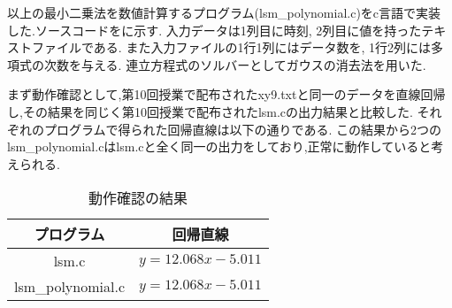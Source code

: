 以上の最小二乗法を数値計算するプログラム(lsm\_polynomial.c)をc言語で実装した.ソースコードをに示す.
入力データは1列目に時刻,
2列目に値を持ったテキストファイルである.
また入力ファイルの1行1列にはデータ数を,
1行2列には多項式の次数を与える.
連立方程式のソルバーとしてガウスの消去法を用いた.

まず動作確認として,第10回授業で配布されたxy9.txtと同一のデータを直線回帰し,その結果を同じく第10回授業で配布されたlsm.cの出力結果と比較した.
それぞれのプログラムで得られた回帰直線は以下の通りである.
この結果から2つのlsm\_polynomial.cはlsm.cと全く同一の出力をしており,正常に動作していると考えられる.
\begin{table}[h]
\caption{動作確認の結果}
\label{tab:dousakakunin}
\centering
\begin{tabular}{cc}
\hline
プログラム&回帰直線\\
\hline \hline
lsm.c&$y=12.068x-5.011$\\
lsm\_polynomial.c&$y=12.068x-5.011$\\
\hline
\end{tabular}
\end{table}